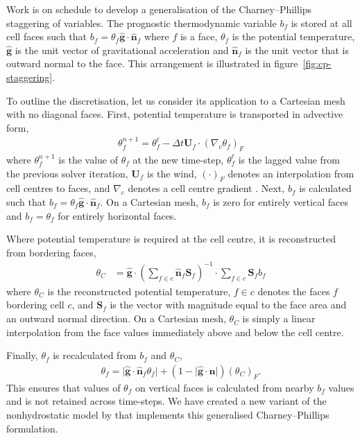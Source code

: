 \documentclass[a4paper,11pt]{article}
\begin{document}
Work is on schedule to develop a generalisation of the Charney--Phillips staggering of variables.  The prognostic thermodynamic variable $b_f$ is stored at all cell faces such that $b_f = \theta_f \mathbf{\hat{g}} \cdot \mathbf{\hat{n}}_f$ where $f$ is a face, $\theta_f$ is the potential temperature, $\mathbf{\hat{g}}$ is the unit vector of gravitational acceleration and $\mathbf{\hat{n}}_f$ is the unit vector that is outward normal to the face.
This arrangement is illustrated in figure~\ref{fig:cp-staggering}.

To outline the discretisation, let us consider its application to a Cartesian mesh with no diagonal faces.  First, potential temperature is transported in advective form,
\begin{align}
	\theta_f^{n+1} = \theta_f^{\ell} - \Delta t \mathbf{U}_f \cdot \left( \nabla_c \theta_f \right)_F
\end{align}
where $\theta_f^{n+1}$ is the value of $\theta_f$ at the new time-step, $\theta_f^\ell$ is the lagged value from the previous solver iteration, $\mathbf{U}_f$ is the wind, $\left( \cdot \right)_F$ denotes an interpolation from cell centres to faces, and $\nabla_c$ denotes a cell centre gradient \citep{weller-shahrokhi2014}.
Next, $b_f$ is calculated such that $b_f = \theta_f \mathbf{\hat{g}} \cdot \mathbf{\hat{n}}_f$.  
On a Cartesian mesh, $b_f$ is zero for entirely vertical faces and $b_f = \theta_f$ for entirely horizontal faces.

Where potential temperature is required at the cell centre, it is reconstructed from bordering faces,
\begin{align}
	\theta_C &= \mathbf{\hat{g}} \cdot \left( \sum_{f \in c} \mathbf{\hat{n}}_f \mathbf{S}_f \right)^{-1} \cdot \sum_{f \in c} \mathbf{S}_f b_f \label{eqn:reconstruct}
\end{align}
where $\theta_C$ is the reconstructed potential temperature, $f \in c$ denotes the faces $f$ bordering cell $c$, and $\mathbf{S}_f$ is the vector with magnitude equal to the face area and an outward normal direction.  On a Cartesian mesh, $\theta_C$ is simply a linear interpolation from the face values immediately above and below the cell centre.

Finally, $\theta_f$ is recalculated from $b_f$ and $\theta_C$,
\begin{align}
	\theta_f = \lvert \mathbf{\hat{g}} \cdot \mathbf{\hat{n}}_f \theta_f \rvert + \left( 1 - \lvert \mathbf{\hat{g}} \cdot \mathbf{\hat{n}} \rvert \right) \left( \theta_C \right)_F \text{.}
\end{align}
This ensures that values of $\theta_f$ on vertical faces is calculated from nearby $b_f$ values and is not retained across time-steps.
We have created a new variant of the nonhydrostatic model by \citet{weller-shahrokhi2014} that implements this generalised Charney--Phillips formulation.
\end{document}
